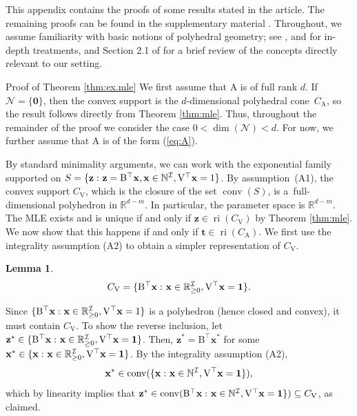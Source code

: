 \documentclass[aos,MSNbibl,nameyear,dvips]{arximspdf}
\newtheorem{lemma}[theorem]{Lemma}
\newcommand{\m}[1]{\mathrm{#1}}
\newcommand{\bfx}{\mathbf{x}}
\newcommand{\bfz}{\mathbf{z}}
\newcommand{\eqref}[1]{(\ref{#1})}
\begin{document}
\begin{appendix}
This appendix contains the proofs of some results stated in the
article. The remaining proofs can be found in the supplementary
material \citet{FRsupp}. Throughout, we assume familiarity with basic
notions of polyhedral geometry; see \citet{ZIE98}, \citet{SCH98} and
\citet{ROCK70} for in-depth treatments, and Section 2.1 of
\citet{ERGM09} for a brief review of the concepts directly relevant to
our setting.

\begin{pf*}{Proof of Theorem \ref{thm:ex.mle}}
We first assume that $\m{A}$ is of full rank $d$. If $\mathcal{N} = \{
\mathbf{0} \}$, then the convex support is the $d$-dimensional
polyhedral cone~$C_{\m{A}}$, so the result follows directly from
Theorem \ref{thm:mle}. Thus, throughout the remainder of the proof we
consider the case $0 < \operatorname{dim}(\mathcal{N}) < d$. For now,
we further assume that $\m{A}$ is of the form \eqref{eq:A}.

By standard minimality arguments, we can work with the exponential
family supported on $S = \{ \mathbf{z} \dvtx \mathbf{z} =
\m{B}^\top\mathbf{x}, \mathbf{x} \in\mathbb{N}^{\mathcal{I}},
\m{V}^\top\bfx= 1\}$. By assumption~(A1), the convex support
$C_{\m{V}}$, which is the closure of the set $\operatorname{conv}(S)$,
is a~full-dimensional polyhedron in $\mathbb{R}^{d-m}$. In particular,
the parameter space is $\mathbb{R}^{d-m}$. The MLE exists and is
unique\vadjust{\goodbreak}
if and only if $\mathbf{z} \in\operatorname{ri}(C_{\m{V}})$ by Theorem
\ref{thm:mle}. We now show that this happens if and only if $\mathbf{t}
\in\operatorname{ri}(C_\m{A})$. We first use the integrality assumption
(A2) to obtain a simpler representation of $C_{\m{V}}$.

\begin{lemma}\label{lem:CN}
%
\[
C_{\m{V}}= \{ \m{B}^\top\bfx\dvtx \bfx\in\mathbb{R}^{\mathcal
{I}}_{\geq0}, \m{V}^\top\bfx= \mathbf{1} \}.
\]
%
\end{lemma}

\begin{pf}
Since $ \{ \m{B}^\top\bfx\dvtx \bfx\in
\mathbb{R}^{\mathcal{I}}_{\geq0}, \m{V}^\top\bfx= 1 \}$ is a polyhedron
(hence closed and convex), it must contain $C_{\m{V}}$. To show the
reverse inclusion, let $\bfz^* \in\{ \m{B}^\top\bfx\dvtx
\bfx\in\mathbb{R}^{\mathcal{I}}_{\geq0}, \m{V}^\top\bfx= \mathbf{1}
\}$. Then, $\bfz^* = \m{B}^\top\bfx^*$ for some $\bfx^* \in\{ \bfx
\dvtx \bfx\in\mathbb{R}^{\mathcal{I}}_{\geq0},\allowbreak \m{V}^\top\bfx=
\mathbf{1} \}$. By the integrality assumption (A2),
%
\[
\bfx^* \in\operatorname{conv}(\{ \bfx\dvtx \bfx\in\mathbb
{N}^{\mathcal{I}}, \m{V}^\top\bfx= \mathbf{1} \}),
\]
%
which by linearity implies that $\bfz^*
\in\operatorname{conv}(\m{B}^\top \bfx\dvtx
\bfx\in\mathbb{N}^{\mathcal{I}}, \m{V}^\top\bfx= \mathbf{1} \})
\subseteq C_{\m{V}}$, as claimed.
\end{pf}


\end{pf*}
\end{appendix}
\end{document}
